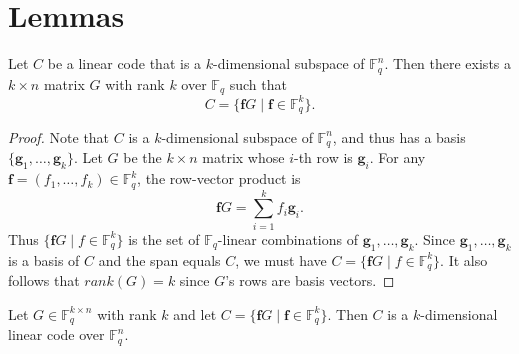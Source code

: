 \section{Lemmas}

\begin{lemma}
    \label{lemma:subspace-imp-generator}
    Let $C$ be a linear code that is a $k$-dimensional subspace of $\mathbb{F}^{n}_{q}$.
    Then there exists a $k \times n$ matrix $G$ with rank $k$ over $\mathbb{F}_q$ such that
    \[
        C = \{\mathbf{f}G \mid \mathbf{f} \in \mathbb{F}^{k}_{q}\}.
    \]
\end{lemma}

\begin{proof}
Note that $C$ is a $k$-dimensional subspace of $\mathbb{F}_q^n$, and thus has a basis $\{\mathbf{g}_1, \ldots, \mathbf{g}_k\}$.
Let $G$ be the $k \times n$ matrix whose $i$-th row is $\mathbf{g}_i$.
For any $\mathbf{f} = (f_1, \ldots, f_k) \in \mathbb{F}_q^k$, the row-vector product is
\[
    \mathbf{f}G = \sum_{i=1}^k f_i \mathbf{g}_i.
\]
Thus $\{\mathbf{f}G \mid f \in \mathbb{F}^{k}_{q}\}$ is the set of $\mathbb{F}_q$-linear combinations of $\mathbf{g}_{1},\ldots, \mathbf{g}_{k}$. 
Since $\mathbf{g}_{1}, \ldots, \mathbf{g}_{k}$ is a basis of $C$ and the span equals $C$, we must have $C = \{\mathbf{f}G \mid f \in \mathbb{F}^{k}_{q}\}$. It also follows that $rank(G)=k$ since $G$'s rows are basis vectors.
\end{proof}

\begin{lemma}
    \label{lemma:generator-imp-subspace}
    Let $G \in \mathbb{F}^{k \times n}_{q}$ with rank $k$ and let $C = \{\mathbf{f}G \mid \mathbf{f} \in \mathbb{F}^{k}_{q}\}$.
    Then $C$ is a $k$-dimensional linear code over $\mathbb{F}^{n}_{q}$.
\end{lemma}

